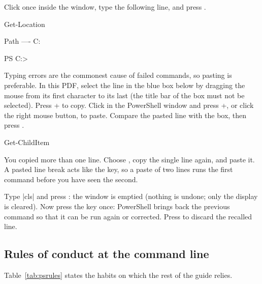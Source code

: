 Click once inside the window, type the following line, and press .
\begin{ps}
Get-Location
\end{ps}
\begin{out}
Path
----
C:\Users\ttrojan

PS C:\Users\ttrojan>
\end{out}

Typing errors are the commonest cause of failed commands, so pasting is preferable. In this PDF,
select the line in the blue box below by dragging the mouse from its first character to its
last (the title bar of the box must not be selected). Press + to copy. Click in
the PowerShell window and press +, or click the right mouse button, to paste.
Compare the pasted line with the box, then press .
\begin{ps}
Get-ChildItem
\end{ps}

\begin{iffail}
You copied more than one line. Choose , copy the single line again, and paste it. A
pasted line break acts like the  key, so a paste of two lines runs the first command
before you have seen the second.
\end{iffail}

Type \code|cls| and press : the window is emptied (nothing is undone; only the
display is cleared). Now press the \key{$\uparrow$} key once: PowerShell brings back the
previous command so that it can be run again or corrected. Press  to discard the
recalled line.

\subsection{Rules of conduct at the command line}

Table~\ref{tab:psrules} states the habits on which the rest of the guide relies.

